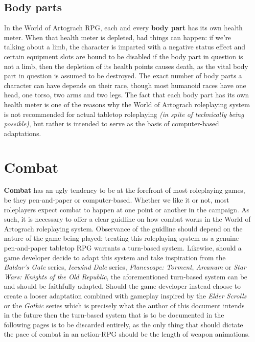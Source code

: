 \documentclass[openany,11pt,a4paper]{book}
\begin{document}
\section{Body parts}
In the World of Artograch RPG, each and every \textbf{body part} has its own health meter. When that health meter is depleted, bad things can happen: if we're talking about a limb, the character is imparted with a negative status effect and certain equipment slots are bound to be disabled \textemdash if the body part in question is not a limb, then the depletion of its health points causes death, as the vital body part in question is assumed to be destroyed.\newline
The exact number of body parts a character can have depends on their race, though most humanoid races have one head, one torso, two arms and two legs.\newline
The fact that each body part has its own health meter is one of the reasons why the World of Artograch roleplaying system is not recommended for actual tabletop roleplaying \textit{(in spite of technically being possible)}, but rather is intended to serve as the basis of computer-based adaptations.
\chapter{Combat}
\textbf{Combat} has an ugly tendency to be at the forefront of most roleplaying games, be they pen-and-paper or computer-based. Whether we like it or not, most roleplayers expect combat to happen at one point or another in the campaign. As such, it is necessary to offer a clear guidline on how combat works in the World of Artograch roleplaying system.\newline
Observance of the guidline should depend on the nature of the game being played: treating this roleplaying system as a genuine pen-and-paper tabletop RPG warrants a turn-based system. Likewise, should a game developer decide to adapt this system and take inspiration from the \textit{Baldur's Gate} series, \textit{Icewind Dale} series, \textit{Planescape: Torment}, \textit{Arcanum} or \textit{Star Wars: Knights of the Old Republic}, the aforementioned turn-based system can be and should be faithfully adapted. Should the game developer instead choose to create a looser adaptation combined with gameplay inspired by the \textit{Elder Scrolls} or the \textit{Gothic} series \textemdash which is precisely what the author of this document intends in the future \textemdash then the turn-based system that is to be documented in the following pages is to be discarded entirely, as the only thing that should dictate the pace of combat in an action-RPG should be the length of weapon animations.
\end{document}
